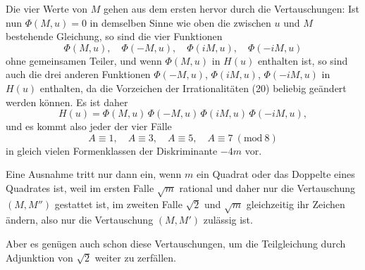 Die vier Werte von $M$ gehen aus dem ersten hervor durch die Vertauschungen:
Ist nun $\Phi(M,u) = 0$ in demselben Sinne wie oben die zwischen $u$ und $M$ bestehende Gleichung, so sind die vier Funktionen
\[
\Phi(M,u), \quad \Phi(-M,u), \quad \Phi(iM,u), \quad \Phi(-iM,u)
\]
ohne gemeinsamen Teiler, und wenn $\Phi(M,u)$ in $H(u)$ enthalten ist, so sind auch die drei anderen Funktionen $\Phi(-M,u)$, $\Phi(iM,u)$, $\Phi(-iM,u)$ in $H(u)$ enthalten, da die Vorzeichen der Irrationalitäten (20) beliebig geändert werden können. Es ist daher
\[
H(u) = \Phi(M,u)\,\Phi(-M,u)\,\Phi(iM,u)\,\Phi(-iM,u),
\]
und es kommt also jeder der vier Fälle
\[
A \equiv 1, \quad A \equiv 3, \quad A \equiv 5, \quad A \equiv 7\ (\mathrm{mod}\ 8)
\]
in gleich vielen Formenklassen der Diskriminante $-4m$ vor.

Eine Ausnahme tritt nur dann ein, wenn $m$ ein Quadrat oder das Doppelte eines Quadrates ist, weil im ersten Falle $\sqrt m$ rational und daher nur die Vertauschung $(M, M'')$ gestattet ist, im zweiten Falle $\sqrt2$ und $\sqrt m$ gleichzeitig ihr Zeichen ändern, also nur die Vertauschung $(M, M')$ zulässig ist.

Aber es genügen auch schon diese Vertauschungen, um die Teilgleichung durch Adjunktion von $\sqrt2$ weiter zu zerfällen.

